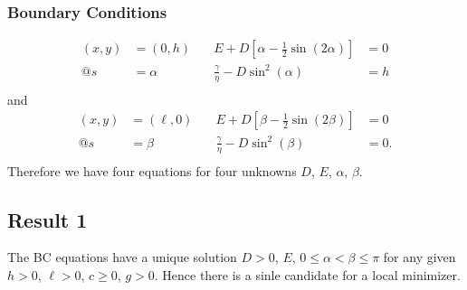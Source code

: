 \documentclass[12pt,twoside]{article}
\begin{document}
\subsubsection{Boundary Conditions}
\begin{align*}
  (x,y) &= (0,h) &\quad E + D\left[ \alpha-\frac{1}{2}\sin(2\alpha) \right] &= 0 \\
  @s &= \alpha &\quad \frac{\gamma}{\eta} - D\sin^2(\alpha) &= h \\
\end{align*}
and
\begin{align*}
  (x,y) &= (\ell,0) &\quad E + D\left[ \beta-\frac{1}{2}\sin(2\beta) \right] &= 0 \\
  @s &= \beta &\quad \frac{\gamma}{\eta} - D\sin^2(\beta) &= 0. \\
\end{align*}
Therefore we have four equations for four unknowns $D$, $E$, $\alpha$, $\beta$.
\subsection{Result 1}
The BC equations have a unique solution $D>0$, $E$, $0\le\alpha<\beta\le\pi$ for
any given $h>0$, $\ell>0$, $c\ge0$, $g>0$. Hence there is a sinle candidate for
a local minimizer.
\end{document}

